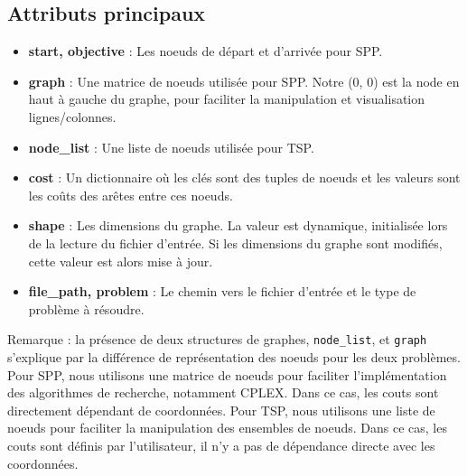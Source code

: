 \subsection{Attributs principaux}
\begin{itemize}
    \item \textbf{start, objective} : Les noeuds de départ et d'arrivée pour \ac{SPP}.
    \item \textbf{graph} : Une matrice de noeuds utilisée pour \ac{SPP}. Notre (0, 0) est la node en haut à gauche du graphe, pour faciliter la manipulation et visualisation lignes/colonnes.
    \item \textbf{node\_list} : Une liste de noeuds utilisée pour \ac{TSP}.
    \item \textbf{cost} : Un dictionnaire où les clés sont des tuples de noeuds et les valeurs sont les coûts des arêtes entre ces noeuds.
    \item \textbf{shape} : Les dimensions du graphe. La valeur est dynamique, initialisée lors de la lecture du fichier d'entrée. Si les dimensions du graphe sont modifiés, cette valeur est alors mise à jour.
    \item \textbf{file\_path, problem} : Le chemin vers le fichier d'entrée et le type de problème à résoudre.
\end{itemize}

Remarque : la présence de deux structures de graphes, \texttt{node\_list}, et \texttt{graph} s'explique par la différence de représentation des noeuds pour les deux problèmes. Pour \ac{SPP}, nous utilisons une matrice de noeuds pour faciliter l'implémentation des algorithmes de recherche, notamment CPLEX. Dans ce cas, les couts sont directement dépendant de coordonnées. Pour \ac{TSP}, nous utilisons une liste de noeuds pour faciliter la manipulation des ensembles de noeuds. Dans ce cas, les couts sont définis par l'utilisateur, il n'y a pas de dépendance directe avec les coordonnées.

